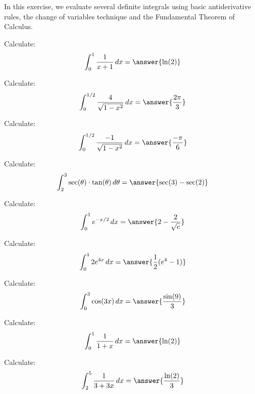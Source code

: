 \documentclass{ximera}
\author{}
\begin{document}
\begin{exercise}

In this exercise, we evaluate several definite integrals using basic antiderivative rules, the change of variables technique  and the Fundamental Theorem of Calculus. 

\begin{exercise} Calculate:
\[
\int_0^1 \frac{1}{x + 1} \d x = \answer{\ln(2)}
\]
\end{exercise}


\begin{exercise} Calculate:
\[
\int_0^{1/2} \frac{4}{\sqrt{1 - x^2}} \d x = \answer{\frac{2\pi }{3}}
\]
\end{exercise}


\begin{exercise} Calculate:
\[
\int_0^{1/2} \frac{-1}{\sqrt{1 - x^2}} \d x = \answer{\frac{-\pi }{6}}
\]
\end{exercise}


\begin{exercise} Calculate:
\[
\int_2^3 \sec(\theta)\cdot \tan(\theta)  \d \theta = \answer{\sec(3)-\sec(2)}
\]
\end{exercise}

\begin{exercise} Calculate:
\[
\int_0^1 e^{-x/2} \d x = \answer{2-\frac{2}{\sqrt{e}}}
\]
\end{exercise}

\begin{exercise} Calculate:
\[
\int_0^1 2e^{4x} \d x = \answer{\frac{1}{2} (e^4-1)}
\]
\end{exercise}

\begin{exercise} Calculate:
\[
\int_0^3 \cos(3x) \d x = \answer{\frac{\sin (9)}{3}}
\]
\end{exercise}



\begin{exercise} Calculate:
\[
\int_0^1 \frac{1}{1 + x} \d x =\answer{\ln(2)}
\]
\end{exercise}

\begin{exercise} Calculate:
\[
\int_2^5 \frac{1}{3+3x} \d x =\answer{\frac{\ln(2)}{3}}
\]
\end{exercise}

\end{exercise}
\end{document}
